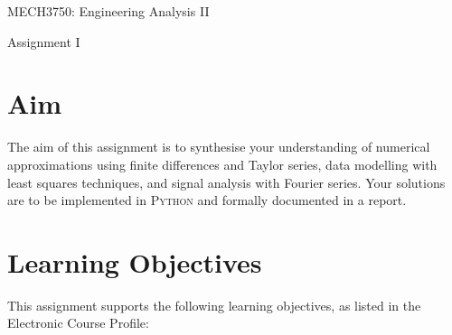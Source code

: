 \documentclass[12pt]{article}
\begin{document}
{\Huge \begin{center}  MECH3750: Engineering Analysis II \end{center}}

\vspace{4mm}

{\Large \begin{center} Assignment I \end{center}}

\vspace{4mm}

\section{\fontsize{14}{14}\selectfont Aim}
The aim of this assignment is to synthesise your understanding of numerical approximations using finite differences and Taylor series, data modelling with least squares techniques, and signal analysis with Fourier series. Your solutions are to be implemented in \textsc{Python} and formally documented in a report.

\section{\fontsize{14}{14}\selectfont Learning Objectives}
This assignment supports the following learning objectives, as listed in the Electronic Course Profile:
\end{document}
